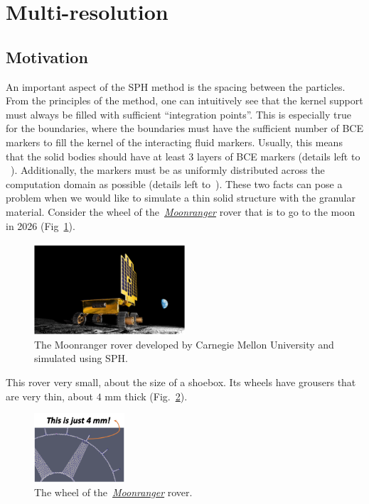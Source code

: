 \documentclass{article}
\begin{document}
\section{Multi-resolution}
\subsection*{Motivation}
An important aspect of the SPH method is the spacing between the particles. From the principles of the method, one can intuitively see that the kernel support must always be filled with sufficient ``integration points''. This is especially true for the boundaries, where the boundaries must have the sufficient number of BCE markers to fill the kernel of the interacting fluid markers. Usually, this means that the solid bodies should have at least 3 layers of BCE markers (details left to ~\citep{adami2012generalized}). Additionally, the markers must be as uniformly distributed across the computation domain as possible (details left to~\citep{liu2010sph,adami2012generalized}). These two facts can pose a problem when we would like to simulate a thin solid structure with the granular material. Consider the wheel of the~\href{https://magazine.cs.cmu.edu/cmu-to-the-moon}{\textit{Moonranger}} rover that is to go to the moon in 2026 (Fig~\ref{fig:moonranger}).
\begin{figure}[h]
  \centering
  \includegraphics[width=0.5\textwidth]{./img/moonranger.png}
  \caption{The Moonranger rover developed by Carnegie Mellon University and simulated using SPH.}
  \label{fig:moonranger}
\end{figure}
This rover very small, about the size of a shoebox. Its wheels have grousers that are very thin, about $4$ mm thick (Fig.~\ref{fig:moonranger_wheel}). 
\begin{figure}[h]
  \centering
  \includegraphics[width=0.3\textwidth]{./img/moonranger_wheel.png}
  \caption{The wheel of the~\href{https://magazine.cs.cmu.edu/cmu-to-the-moon}{\textit{Moonranger}} rover.}
  \label{fig:moonranger_wheel}
\end{figure}
\end{document}
